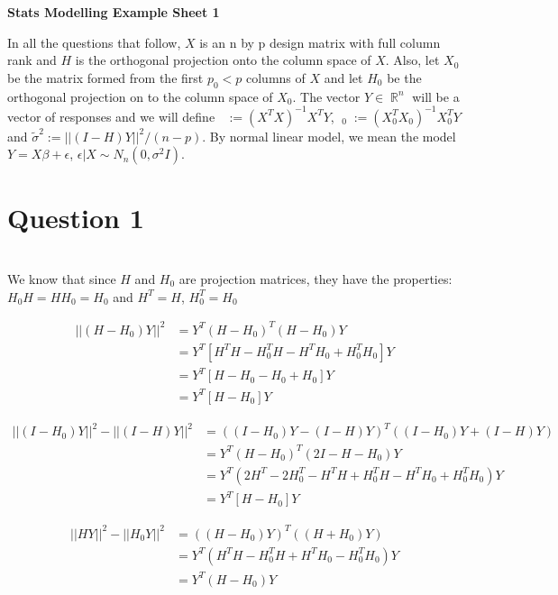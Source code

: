 \documentclass{article}
\DeclareMathOperator{\hbb}{\hat{\boldsymbol{\beta}}}
\DeclareMathOperator{\real}{\mathbb{R}}
\begin{document}
\begin{center}\LARGE\bf
	Stats Modelling Example Sheet 1
\end{center}

In all the questions that follow, $ X $ is an n by p design matrix with full column rank and $ H $ is the orthogonal projection onto the column space of $ X $. Also, let $ X_0 $ be the matrix formed from the first $ p_0 < p $ columns of $ X $ and let $ H_0 $ be the orthogonal projection on to the column space of $ X_0 $. The vector $ Y \in \real^n $ will be a vector of responses and we will define $ \hbb := (X^TX)^{-1}X^TY $, $ \hbb_0 :=(X_0^T X_0)^{-1}X_0^T Y $ and $ \tilde{\sigma}^2 := ||(I-H)Y||^2/(n-p)$. By normal linear model, we mean the model $ Y = X\beta + \epsilon $, $ \epsilon | X \sim N_n(0, \sigma^2 I) $.

\section{Question 1}
\bigskip \\
We know that since $ H $ and $ H_0 $ are projection matrices, they have the properties: $ H_0 H = HH_0 = H_0 $ and $ H^T = H $, $ H_0^T = H_0 $

\begin{align}
	||(H-H_0)Y||^2 & = Y^T(H-H_0)^T(H-H_0)Y \\
	& = Y^T[H^TH - H_0^TH - H^TH_0 + H_0^TH_0]Y \\
	& = Y^T[H - H_0 - H_0 + H_0]Y \\
	& = Y^T[H-H_0]Y
\end{align}

\begin{align}
	||(I-H_0)Y||^2 - ||(I-H)Y||^2  & = ((I-H_0)Y - (I-H)Y)^T((I-H_0)Y + (I-H)Y) \\
	& = Y^T(H-H_0)^T(2I-H-H_0)Y \\
	& = Y^T(2H^T - 2H_0^T - H^TH + H_0^TH - H^TH_0 + H_0^TH_0)Y \\
	& = Y^T[H-H_0]Y
\end{align}

\begin{align}
	||HY||^2 - ||H_0Y||^2 & = ((H-H_0)Y)^T((H+H_0)Y) \\
	& = Y^T(H^TH - H_0^TH + H^TH_0 - H_0^TH_0)Y \\
	& = Y^T(H-H_0)Y
\end{align}
\end{document}
